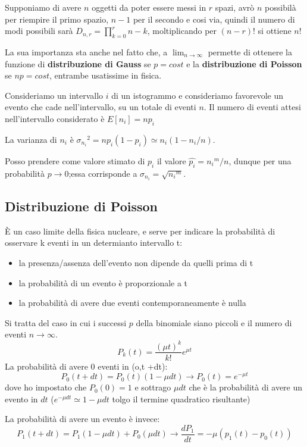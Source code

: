 \documentclass{article}
\begin{document}
Supponiamo di avere $n$ oggetti da poter essere messi in $r$ spazi, avrò $n$ possibilà per riempire il primo spazio, $n-1$ per il secondo e cosi via, quindi il numero di 
modi possibili sarà $\displaystyle D_{n,r}=\prod_{k=0}^{r}n-k$, moltiplicando per $(n-r)!$ si ottiene $n!$

\vspace{1cm}

La sua importanza sta anche nel fatto che, a $\lim_{n \rightarrow \infty}$ permette di ottenere la funzione
di \textbf{distribuzione di Gauss} se $p=cost$ e la \textbf{distribuzione di Poisson} se $np=cost$, entrambe usatissime in fisica.


Consideriamo un intervallo $i$ di un istogrammo e consideriamo favorevole un evento che cade nell'intervallo, su un totale di eventi $n$.
Il numero di eventi attesi nell’intervallo considerato è $E[n_i]=n p_i$

La varianza di $n_i$ è ${\sigma_{n_i}}^2=n p_i (1-p_i) \simeq n_i (1- n_i/n)$.

Posso prendere come valore stimato di $p_i$ il valore $\hat{p_i}={n_i}^m/n$, dunque per 
una probabilità $p \rightarrow 0$;essa corrisponde a $\sigma_{n_i}=\sqrt{{n_i}^m}$.

\subsection{Distribuzione di Poisson}
È un caso limite della fisica nucleare, e serve per indicare la probabilità di osservare k eventi in un determianto intervallo t:
\begin{itemize}
    \item la presenza/assenza dell'evento non dipende da quelli prima di t
    \item la probabilità di un evento è proporzionale a t
    \item la probabilità di avere due eventi contemporaneamente è nulla
\end{itemize}
Si tratta del caso in cui i successi $p$ della binomiale siano piccoli e il numero di eventi $n \rightarrow \infty$. 
\[
    P_k(t)=\frac{(\mu t)^k}{k!}e^{\mu t}
\]
La probabilità di avere 0 eventi in (o,t +dt):
\[
P_0(t+dt)=P_0(t)(1-\mu dt) \rightarrow P_0(t)=e^{-\mu t}
\]
dove ho impostato che $P_0(0)=1$ e sottrago $\mu dt$ che è la probabilità di avere un evento in $dt$ ($e^{-\mu dt}\simeq 1-\mu dt$ tolgo il termine quadratico risultante)

La probabilità di avere un evento è invece:
\[
P_1(t+dt)=P_1(1-\mu dt) + P_0(\mu dt) \rightarrow \frac{dP_1}{dt}=- \mu (p_1(t)-p_0(t))
\]
\end{document}
